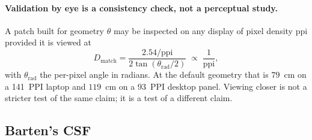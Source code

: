 \documentclass[11pt,a4paper]{article}
\begin{document}
\paragraph{Validation by eye is a consistency check, not a perceptual
study.} A patch built for geometry $\theta$ may be inspected on any display
of pixel density $\mathrm{ppi}$ provided it is viewed at
\begin{equation}
  D_{\mathrm{match}} = \frac{2.54/\mathrm{ppi}}
                            {2\tan(\theta_{\mathrm{rad}}/2)}
  \;\propto\; \frac{1}{\mathrm{ppi}},
  \label{eq:matched}
\end{equation}
with $\theta_{\mathrm{rad}}$ the per-pixel angle in radians. At the default
geometry that is $79$~cm on a 141~PPI laptop and $119$~cm on a 93~PPI
desktop panel. Viewing closer is not a stricter test of the same claim; it
is a test of a different claim.

\subsection{Barten's CSF}
\end{document}

